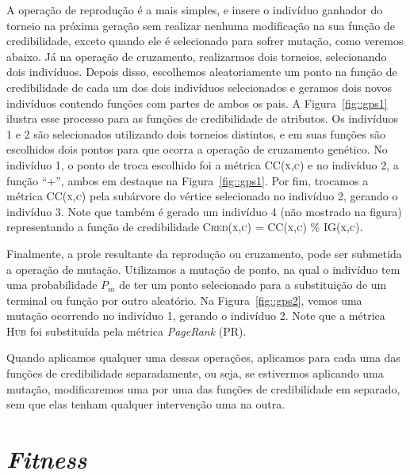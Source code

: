 A operação de reprodução é a mais simples, e insere o indivíduo ganhador do torneio na próxima geração sem realizar nenhuma modificação na sua função de credibilidade, exceto quando ele é selecionado para sofrer mutação, como veremos abaixo. Já na operação de cruzamento, realizarmos dois torneios, selecionando dois indivíduos.
Depois disso, escolhemos aleatoriamente um ponto na função de credibilidade de cada um dos dois indivíduos selecionados e geramos dois novos indivíduos contendo funções com partes de ambos os pais. A Figura~\ref{fig::gps1} ilustra esse processo para as funções de credibilidade de atributos.
Os indivíduos 1 e 2 são selecionados utilizando dois torneios distintos, e em suas funções são escolhidos dois pontos para que ocorra a operação de cruzamento genético.
No indivíduo 1, o ponto de troca escolhido foi a métrica
\textsc{CC(x,c)}
e no indivíduo 2, a função ``+'', ambos em destaque na Figura~\ref{fig::gps1}.
Por fim, trocamos a métrica \textsc{CC(x,c)} pela subárvore do vértice selecionado no indivíduo 2, gerando o indivíduo 3.
Note que também é gerado um indivíduo 4 (não mostrado na figura) representando a função de credibilidade \textsc{Cred(x,c) = CC(x,c) \% IG(x,c)}.

Finalmente, a prole resultante da reprodução ou cruzamento, pode ser submetida a operação de mutação. Utilizamos a mutação de ponto, na qual o indivíduo tem uma probabilidade $P_m$ de ter um ponto selecionado para a substituição de um terminal ou função por outro aleatório.
Na Figura~\ref{fig::gps2}, vemos uma mutação ocorrendo no indivíduo 1, gerando o indivíduo 2. Note que a métrica \textsc{Hub} foi substituída pela métrica \textit{PageRank} (\textsc{PR}).

Quando aplicamos qualquer uma dessas operações, aplicamos para cada uma das funções de credibilidade separadamente, ou seja, se estivermos aplicando uma mutação, modificaremos uma por uma das funções de credibilidade em separado, sem que elas tenham qualquer intervenção uma na outra.


\section{\textit{Fitness}}
\label{subsec::fitness}


